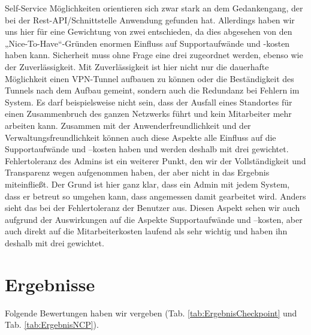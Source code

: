 Self-Service Möglichkeiten orientieren sich zwar stark an dem Gedankengang, der bei der Rest-API/Schnittstelle Anwendung gefunden hat. Allerdings haben wir uns hier für eine Gewichtung von zwei entschieden, da dies abgesehen von den „Nice-To-Have“-Gründen enormen Einfluss auf Supportaufwände und -kosten haben kann. Sicherheit muss ohne Frage eine drei zugeordnet werden, ebenso wie der Zuverlässigkeit. Mit Zuverlässigkeit ist hier nicht nur die dauerhafte Möglichkeit einen VPN-Tunnel aufbauen zu können oder die Beständigkeit des Tunnels nach dem Aufbau gemeint, sondern auch die Redundanz bei Fehlern im System. Es darf beispielsweise nicht sein, dass der Ausfall eines Standortes für einen Zusammenbruch des ganzen Netzwerks führt und kein Mitarbeiter mehr arbeiten kann. Zusammen mit der Anwenderfreundlichkeit und der Verwaltungsfreundlichkeit können auch diese Aspekte alle Einfluss auf die Supportaufwände und –kosten haben und werden deshalb mit drei gewichtet. Fehlertoleranz des Admins ist ein weiterer Punkt, den wir der Vollständigkeit und Transparenz wegen aufgenommen haben, der aber nicht in das Ergebnis miteinfließt. Der Grund ist hier ganz klar, dass ein Admin mit jedem System, dass er betreut so umgehen kann, dass angemessen damit gearbeitet wird. Anders sieht das bei der Fehlertoleranz der Benutzer aus. Diesen Aspekt sehen wir auch aufgrund der Auswirkungen auf die Aspekte Supportaufwände und –kosten, aber auch direkt auf die Mitarbeiterkosten laufend als sehr wichtig und haben ihn deshalb mit drei gewichtet.


\section{Ergebnisse} %
\label{sec:Ergebnisse}

Folgende Bewertungen haben wir vergeben (Tab. \ref{tab:ErgebnisCheckpoint} und Tab. \ref{tab:ErgebnisNCP}).

